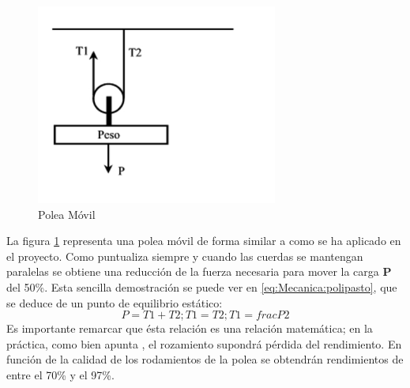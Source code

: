     \begin{minipage}{0.30\textwidth}
        \begin{figure}[H]
            \centering
            \includegraphics[width=\textwidth]{figuras/Imagenes_Mecanica/pmovil.png}
            \caption{Polea Móvil}
            \label{fig:Mecanica:pmovil}
        \end{figure}
    \end{minipage}
    \begin{minipage}{0.60\textwidth}\raggedright

        La figura \ref{fig:Mecanica:pmovil} representa una polea móvil de forma similar a como se ha aplicado en el proyecto. Como puntualiza \cite{granvertical} siempre y cuando las cuerdas se mantengan paralelas se obtiene una reducción de la fuerza necesaria para mover la carga \textbf{P} del 50\%. Esta sencilla demostración se puede ver en \ref{eq:Mecanica:polipasto}, que se deduce de un punto de equilibrio estático:
        \begin{equation}
            \label{eq:Mecanica:polipasto}
            P = T1 + T2 ; T1 = T2 ; T1 = frac{P}{2}
        \end{equation}
        Es importante remarcar que ésta relación es una relación matemática; en la práctica, como bien apunta \cite{granvertical}, el rozamiento supondrá pérdida del rendimiento. En función de la calidad de los rodamientos de la polea se obtendrán rendimientos de entre el 70\% y el 97\%.
    \end{minipage}

